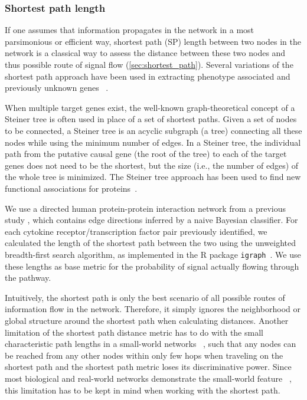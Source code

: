 \subsubsection{Shortest path length}
If one assumes that information propagates in the network in a most parsimonious
or efficient way,
shortest path (SP) length between two nodes in the network is a classical way to
assess the distance between these two nodes and thus possible route of signal flow
(\ref{sec:shortest_path}). Several variations of the 
shortest path approach have been used in extracting 
phenotype associated and previously unknown genes~%
\citep{Zhou2002,Managbanag2008}.

When multiple target genes exist, the well-known graph-theoretical concept of a Steiner tree is often used in place of a set of shortest paths. Given a set of nodes to be connected, a Steiner tree is an acyclic subgraph (a tree) connecting all these nodes while using the minimum number of edges. In a Steiner tree, the individual path from the putative causal gene (the root of the tree) to each of the target genes does not need to be the shortest, but the size (i.e., the number of edges) of the whole tree is minimized. The Steiner tree approach has been used to find new functional associations for proteins~\citep{Huang2009,Bailly-Bechet2011}.

We use a directed human protein-protein interaction network from a previous study
\citep{Vinayagam2011}, which contains edge directions
inferred by a naive Bayesian classifier.
For each cytokine receptor/transcription factor pair previously identified,
we calculated the length of the shortest path between the two
using the unweighted breadth-first search algorithm,
as implemented in the R package \texttt{igraph}~\citep{Csardi2006}.
We use these lengths as base metric for the probability 
of signal actually flowing through the pathway.

Intuitively, the shortest path is only the best scenario of all possible routes
of information flow in the network. Therefore, it simply ignores the 
neighborhood or global structure around the shortest path when calculating
distances. Another limitation of the shortest path distance metric has to do
with the small characteristic path lengths in a small-world networks~%
\citep{Watts1998}, such that any nodes can be reached from any other nodes
within only few hops when traveling on the shortest path and the shortest path
metric loses its discriminative power. Since most biological
and real-world networks demonstrate the small-world feature~%
\citep{Barabasi2004}, this limitation
has to be kept in mind when working with the shortest path.

